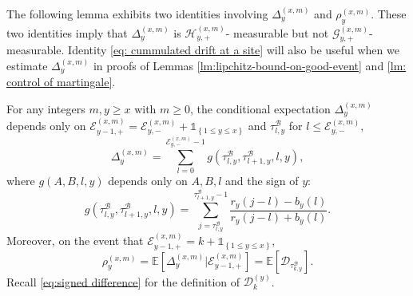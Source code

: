 \documentclass[EJP]{ejpecp} %
\begin{document}
The following lemma exhibits two identities involving $\Delta^{(x,m)}_{y}$ and $\rho_{y}^{(x,m)}$. These two identities imply that $\Delta^{(x,m)}_{y}$ is $\mathcal{H}_{y, +}^{(x,m)}$- measurable but not $\mathcal{G}_{y, +}^{(x,m)}$- measurable. 
Identity \eqref{eq: cummulated drift at a site} will also be useful when we estimate $\Delta_y^{(x,m)}$ in proofs of Lemmas \ref{lm:lipchitz-bound-on-good-event} and \ref{lm: control of martingale}.
\begin{lemma}\label{lm: identities for Del, rho} 
	For any integers $m,y\geq x$ with $m\geq 0$, the conditional expectation $\Delta^{(x,m)}_{y}$ depends only on $ \mathcal{E}_{y-1,+}^{(x,m)} = \mathcal{E}_{y,-}^{(x,m)} + \mathbb{1}_{ \left\{ 1\leq y \leq x \right\} }$ and $ \tau^{\mathscr{B}}_{l,y}$ for $l\leq \mathcal{E}^{(x,m)}_{y,-} $,
	\begin{equation} \label{eq: cummulated drift at a site}
		\Delta_{y}^{(x,m)} = \sum_{l=0 }^{ \mathcal{E}^{(x,m)}_{y,-} -1  } g\left(\tau^{\mathscr{B}}_{l,y},\tau^{\mathscr{B}}_{l+1,y},l,y \right),
	\end{equation}	
	where $g(A,B,l,y)$ depends only on $A,B,l$ and the sign of $y$:
	\begin{equation}\label{eq: cummulated drift at a site2}
		g\left(\tau^{\mathscr{B}}_{l,y},\tau^{\mathscr{B}}_{l+1,y},l,y\right)
		= \sum_{j=\tau^{\mathscr{B}}_{l,y}}^{\tau^{\mathscr{B}}_{l+1,y}-1} \frac{ r_y( j-l) - b_y(l)  }{ r_y( j-l) + b_y(l)  }.
	\end{equation}
	Moreover, on the event that $\mathcal{E}^{(x,m)}_{y-1,+}  = k + \mathbb{1}_{\left\{1\leq y\leq x\right\}}$,
	\begin{equation} \label{eq: conditional mean in GPU represenetation}
		\rho_{y}^{(x,m)} = \mathbb{E}\left[ \Delta_{y}^{(x,m)}\vert \mathcal{E}^{(x,m)}_{y-1,+} \right]	  
		= \mathbb{E}\left[  \mathscr{D}_{\tau^{\mathscr{B}}_{k,y}} \right].
	\end{equation}
	Recall \eqref{eq:signed difference} for the definition of $\mathscr{D}^{(y)}_k$.	
\end{lemma}
\end{document}
